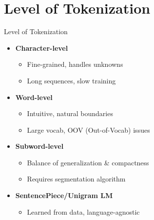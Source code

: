 \section{Level of Tokenization}
\begin{frame}{Level of Tokenization}
\begin{itemize}
    \item \textbf{Character-level}
    \begin{itemize}
        \item Fine-grained, handles unknowns
        \item Long sequences, slow training
    \end{itemize}
    \item \textbf{Word-level}
    \begin{itemize}
        \item Intuitive, natural boundaries
        \item Large vocab, OOV (Out-of-Vocab) issues
    \end{itemize}
    \item \textbf{Subword-level}
    \begin{itemize}
        \item Balance of generalization \& compactness
        \item Requires segmentation algorithm
    \end{itemize}
    \item \textbf{SentencePiece/Unigram LM}
    \begin{itemize}
        \item Learned from data, language-agnostic
    \end{itemize}
\end{itemize}
\end{frame}